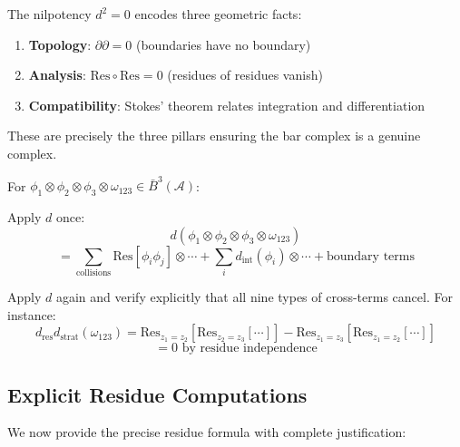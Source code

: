 \begin{remark}
The nilpotency $d^2 = 0$ encodes three geometric facts:
\begin{enumerate}
\item \textbf{Topology}: $\partial \partial = 0$ (boundaries have no boundary)
\item \textbf{Analysis}: $\text{Res}\circ\text{Res} = 0$ (residues of residues vanish)
\item \textbf{Compatibility}: Stokes' theorem relates integration and differentiation
\end{enumerate}
These are precisely the three pillars ensuring the bar complex is a genuine complex.
\end{remark}

\begin{example}
For $\phi_1 \otimes \phi_2 \otimes \phi_3 \otimes \omega_{123} \in \bar{B}^3(\mathcal{A})$:

Apply $d$ once:
$$d(\phi_1 \otimes \phi_2 \otimes \phi_3 \otimes \omega_{123})$$
$$= \sum_{\text{collisions}} \text{Res}[\phi_i \phi_j] \otimes \cdots + 
\sum_i d_{\text{int}}(\phi_i) \otimes \cdots + 
\text{boundary terms}$$

Apply $d$ again and verify explicitly that all nine types of cross-terms cancel. 
For instance:
$$d_{\text{res}} d_{\text{strat}}(\omega_{123}) = 
\text{Res}_{z_1=z_2}[\text{Res}_{z_2=z_3}[\cdots]] - 
\text{Res}_{z_1=z_3}[\text{Res}_{z_1=z_2}[\cdots]]$$
$$= 0 \text{ by residue independence}$$
\end{example}

\subsection{Explicit Residue Computations}
 
We now provide the precise residue formula with complete justification:
 
